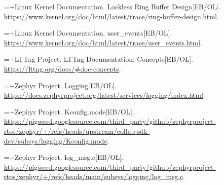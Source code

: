 {\songti\tnr{}\setlength{\parindent}{0pt}\setlength{\parskip}{0pt}

\setlength{\parfillskip}{0pt plus 1fil}

\newlength{\thesisrefnumwd}

\newlength{\thesisrefgap}

\setlength{\thesisrefgap}{0.5em}

\settowidth{\thesisrefnumwd}{[30]}

\noindent\hangindent=\dimexpr\thesisrefnumwd+\thesisrefgap\relax{}\makebox[\thesisrefnumwd][l]{[1]}\nobreak\hspace{\thesisrefgap}Linux Kernel Documentation. Lockless Ring Buffer Design{[}EB/OL{]}. \url{https://www.kernel.org/doc/html/latest/trace/ring-buffer-design.html}.\par

\noindent\hangindent=\dimexpr\thesisrefnumwd+\thesisrefgap\relax{}\makebox[\thesisrefnumwd][l]{[2]}\nobreak\hspace{\thesisrefgap}Linux Kernel Documentation. user\_events{[}EB/OL{]}. \url{https://www.kernel.org/doc/html/latest/trace/user_events.html}.\par

\noindent\hangindent=\dimexpr\thesisrefnumwd+\thesisrefgap\relax{}\makebox[\thesisrefnumwd][l]{[3]}\nobreak\hspace{\thesisrefgap}LTTng Project. LTTng Documentation: Concepts{[}EB/OL{]}. \url{https://lttng.org/docs/\#doc-concepts}.\par

\noindent\hangindent=\dimexpr\thesisrefnumwd+\thesisrefgap\relax{}\makebox[\thesisrefnumwd][l]{[4]}\nobreak\hspace{\thesisrefgap}Zephyr Project. Logging{[}EB/OL{]}. \url{https://docs.zephyrproject.org/latest/services/logging/index.html}.\par

\noindent\hangindent=\dimexpr\thesisrefnumwd+\thesisrefgap\relax{}\makebox[\thesisrefnumwd][l]{[5]}\nobreak\hspace{\thesisrefgap}Zephyr Project. Kconfig.mode{[}EB/OL{]}. \url{https://pigweed.googlesource.com/third_party/github/zephyrproject-rtos/zephyr/+/refs/heads/upstream/collab-sdk-dev/subsys/logging/Kconfig.mode}.\par

\noindent\hangindent=\dimexpr\thesisrefnumwd+\thesisrefgap\relax{}\makebox[\thesisrefnumwd][l]{[6]}\nobreak\hspace{\thesisrefgap}Zephyr Project. log\_msg.c{[}EB/OL{]}. \url{https://pigweed.googlesource.com/third_party/github/zephyrproject-rtos/zephyr/+/refs/heads/main/subsys/logging/log_msg.c}.\par

}
